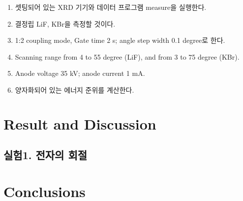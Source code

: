 \documentclass[a4paper, 10pt, nanum]{CSUniSchoolLabReport}
\begin{document}
	\begin{enumerate}[label=\arabic*.]
		\item 셋팅되어 있는 XRD 기기와 데이터 프로그램 measure을 실행한다.
		\item 결정립 LiF, KBr을 측정할 것이다.
		\item 1:2 coupling mode, Gate time 2 s; angle step width 0.1 degree로 한다.
		\item Scanning range from 4 to 55 degree (LiF), and from 3 to 75 degree (KBr).
		\item Anode voltage 35 kV; anode current 1 mA.
		\item 양자화되어 있는 에너지 준위를 계산한다.		
	\end{enumerate}


\section{Result and Discussion}

\subsection*{실험1. 전자의 회절}

	\begin{table}[ht!]
		\label{tab:2}
		\centering
		\caption{}
	\end{table}



\section{Conclusions}
\end{document}
